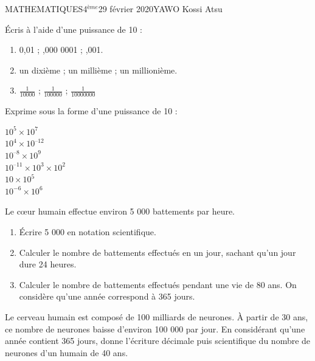 \documentclass[12pt,a4paper]{book}
\newcommand{\prof}{YAWO Kossi Atsu}
\newcommand{\matiere}{MATHEMATIQUES}
\newcommand{\classe}{4$^{ème}$}
\begin{document}
\newpage
\begin{td}{\matiere}{\classe}{29 février 2020}{\prof}
\begin{exo}
Écris à l'aide d'une puissance de 10 :
\begin{enumerate}
\item 0,01 \quad ; ,000 0001 \quad ; ,001.
\item un dixième \quad ; \quad  un millième \quad ; \quad  un millionième.
\item $\frac{1}{10000}$ \quad ; \quad  $\frac{1}{100000}$ \quad ; \quad  $\frac{1}{10000000}$
\end{enumerate}
\end{exo}

\vspace{0.5cm}

\begin{exo}

Exprime sous la forme d'une puissance de 10 :
\begin{multicols}{4}
$10^5 \times 10^7$\\
$10^4 \times 10^{–12}$\\
$10^{–8} \times 10^9$\\
$10^{–11} \times 10^3 \times 10^2$\\
$10 \times 10^5$\\
$10^{-6} \times 10^6$\\
\end{multicols}
\end{exo}

\vspace{0.5cm}

\begin{exo}
Le cœur humain effectue environ 5 000 battements par heure.
\begin{enumerate}
\item Écrire 5 000 en notation scientifique.
\item Calculer le nombre de battements effectués en un jour, sachant qu'un jour dure 24 heures.
\item Calculer le nombre de battements effectués pendant une vie de 80 ans. On considère qu'une année correspond à 365 jours.
\end{enumerate}
\end{exo}

\vspace{0.5cm}

\begin{exo}
Le cerveau humain est composé de 100 milliards de neurones. À partir de 30 ans, ce nombre de neurones baisse d'environ 100 000 par jour. En considérant qu'une année contient 365 jours, donne l'écriture décimale puis scientifique du nombre de neurones d'un humain de 40 ans.
\end{exo}


\end{td}
\end{document}
